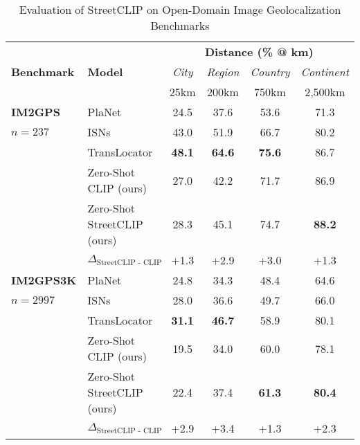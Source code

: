 \documentclass{article}
\renewcommand{\cite}[1]{\citep{#1}}
\begin{document}
\begin{table*}[t]
\caption{Evaluation of StreetCLIP on Open-Domain Image Geolocalization Benchmarks}
\label{table:ODIG}
\vskip 0.15in
\begin{center}
\begin{small}
\begin{sc}
\begin{tabular}{llcccc}
\toprule
& & \multicolumn{4}{c}{\textbf{Distance (\% @ km)}}\\
\textbf{Benchmark} & \textbf{Model} & \textit{City} & \textit{Region} & \textit{Country} & \textit{Continent} \\
& & 25km & 200km & 750km & 2,500km\\
\midrule
  \textbf{IM2GPS}  & PlaNet \cite{Weyand_2016} & 24.5 & 37.6 & 53.6 & 71.3\\
 $n=237$ & ISNs \cite{budack_2018} & 43.0 & 51.9 & 66.7 & 80.2\\
  &      TransLocator \cite{pramanick_2022}  & \textbf{48.1} & \textbf{64.6} & \textbf{75.6} & 86.7       \\
 \cmidrule{2-6}
                    &      Zero-Shot CLIP (ours)       &  27.0 & 42.2 & 71.7 & 86.9      \\
                    &      Zero-Shot StreetCLIP (ours)    &  28.3  & 45.1 & 74.7 & \textbf{88.2}       \\
\cmidrule{2-6}
                    & \textbf{$\Delta_{\text{StreetCLIP - CLIP}}$} & +1.3 & +2.9 & +3.0 & +1.3\\
\midrule
\textbf{IM2GPS3K} & PlaNet \cite{Weyand_2016} & 24.8 & 34.3 & 48.4 & 64.6\\
$n=2997$ & ISNs \cite{budack_2018} &  28.0 & 36.6 & 49.7 & 66.0\\
& TransLocator \cite{pramanick_2022} & \textbf{31.1} &  \textbf{46.7} & 58.9 &  80.1       \\
 \cmidrule{2-6}
                    &      Zero-Shot CLIP (ours)      &  19.5 & 34.0 & 60.0 & 78.1       \\
                    &      Zero-Shot StreetCLIP (ours)    &  22.4  & 37.4 & \textbf{61.3} & \textbf{80.4}       \\
\cmidrule{2-6}
                    & \textbf{$\Delta_{\text{StreetCLIP - CLIP}}$} & +2.9 & +3.4 & +1.3 & +2.3\\
\bottomrule

\end{tabular}
\end{sc}
\end{small}
\end{center}
\vskip -0.1in
\end{table*}
\end{document}
